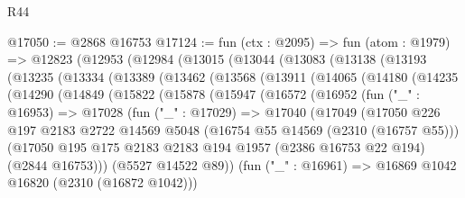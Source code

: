 \begin{lexlean}{R44}
\begin{coremodule}
@17050 := @2868 @16753
@17124 := fun (ctx : @2095) =>
  fun (atom : @1979) =>
  @12823
    (@12953
      (@12984
        (@13015
          (@13044
            (@13083
              (@13138
                (@13193
                  (@13235
                    (@13334
                      (@13389
                        (@13462
                          (@13568
                            (@13911
                              (@14065
                                (@14180
                                  (@14235
                                    (@14290
                                      (@14849
                                        (@15822
                                          (@15878
                                            (@15947
                                              (@16572
                                                (@16952
                                                  (fun ("_" : @16953) =>
                                                  @17028
                                                    (fun ("_" : @17029) =>
                                                    @17040
                                                      (@17049
                                                        (@17050
                                                          @226
                                                          @197
                                                          @2183
                                                          @2722
                                                          @14569
                                                          @5048
                                                          (@16754 @55 @14569 (@2310 (@16757 @55)))
                                                          (@17050
                                                            @195
                                                            @175
                                                            @2183
                                                            @2183
                                                            @194
                                                            @1957
                                                            (@2386 @16753 @22 @194)
                                                            (@2844 @16753)))
                                                        (@5527 @14522 @89))
                                                      (fun ("_" : @16961) =>
                                                      @16869 @1042 @16820 (@2310 (@16872 @1042)))

\end{coremodule}
\end{lexlean}

